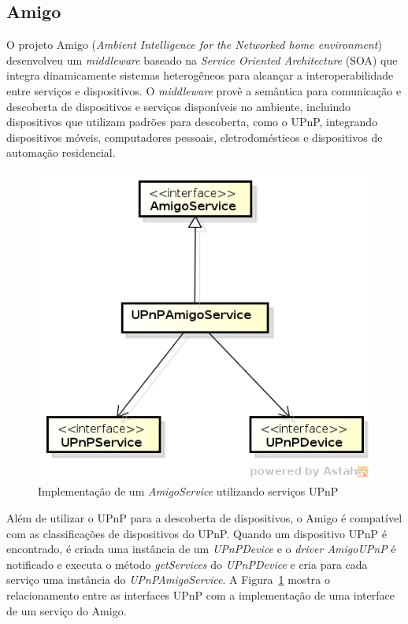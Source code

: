 \subsection{Amigo}
O projeto Amigo (\emph{Ambient Intelligence for the Networked home environment})~\cite{amigoCore, amigoArch} desenvolveu um \emph{middleware} baseado na \emph{Service Oriented Architecture} (SOA) que integra dinamicamente sistemas heterogêneos para alcançar a interoperabilidade entre serviços e dispositivos. O \emph{middleware} provê a semântica para comunicação e descoberta de dispositivos e serviços disponíveis no ambiente, incluindo dispositivos que utilizam padrões para descoberta, como o UPnP, integrando dispositivos móveis, computadores pessoais, eletrodomésticos e dispositivos de automação residencial.

\begin{figure}[ht]
\center
\includegraphics[scale=0.8]{imagens/amigo-interfaces}
\caption{Implementação de um \emph{AmigoService} utilizando serviços UPnP}
\label{fig:amigoInterfaces}
\end{figure}

Além de utilizar o UPnP para a descoberta de dispositivos, o Amigo é compatível com as classificações de dispositivos do UPnP. Quando um dispositivo UPnP é encontrado, é criada uma instância de um \emph{UPnPDevice} e o \emph{driver AmigoUPnP} é notificado e executa o método \emph{getServices} do \emph{UPnPDevice} e cria para cada serviço uma instância do \emph{UPnPAmigoService}. A Figura~\ref{fig:amigoInterfaces} mostra o relacionamento entre as interfaces UPnP com a implementação de uma interface de um serviço do Amigo.

